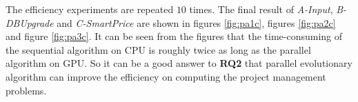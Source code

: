 The efficiency experiments are repeated $10$ times.  The final result of
\emph{A-Input}, \emph{B-DBUpgrade} and \emph{C-SmartPrice} are shown in figures
\ref{fig:pa1c}, figures \ref{fig:pa2c} and figure \ref{fig:pa3c}. It can be seen
from the figures that the time-consuming of the sequential algorithm on CPU is
roughly twice as long as the parallel algorithm on GPU. So it can be a good
answer to \textbf{RQ2} that parallel evolutionary algorithm can improve the
efficiency on computing the project management problems.

